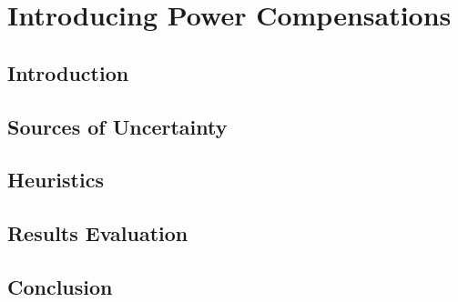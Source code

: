 \chapter{Introducing Power Compensations}

\section{Introduction}

\section{Sources of Uncertainty}

\section{Heuristics}

\section{Results Evaluation}

\section{Conclusion}